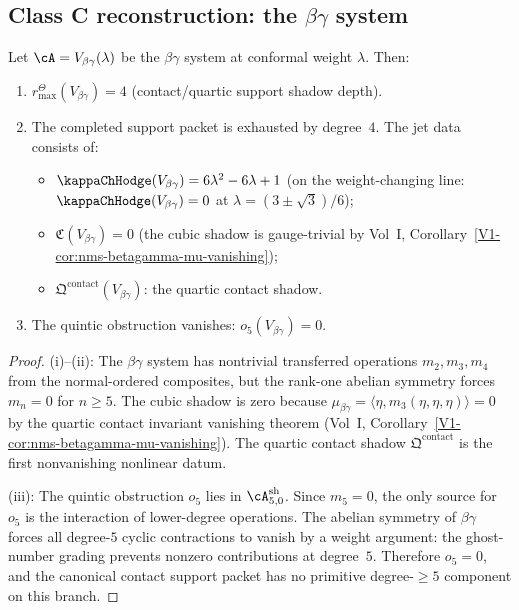 \subsection{Class C reconstruction: the $\beta\gamma$ system}

\begin{theorem}
\label{thm:class-c-reconstruction}
Let $\cA = V_{\beta\gamma}(\lambda)$ be the $\beta\gamma$ system at conformal weight
$\lambda$. Then:
\begin{enumerate}[label=\textup{(\roman*)}]
\item \(r^\Theta_{\max}(V_{\beta\gamma}) = 4\) (contact/quartic support shadow depth).
\item The completed support packet is exhausted by degree~$4$. The jet data consists of:
 \begin{itemize}
 \item $\kappaChHodge(V_{\beta\gamma}) = 6\lambda^2 - 6\lambda + 1$ (on the weight-changing
 line: \(\kappaChHodge(V_{\beta\gamma}) = 0\) at
 \(\lambda = (3 \pm \sqrt{3})/6\));
 \item $\mathfrak{C}(V_{\beta\gamma}) = 0$ (the cubic shadow is gauge-trivial by
 Vol~I, Corollary~\ref*{V1-cor:nms-betagamma-mu-vanishing});
 \item $\mathfrak{Q}^{\mathrm{contact}}(V_{\beta\gamma})$: the quartic contact shadow.
 \end{itemize}
\item The quintic obstruction vanishes: $o_5(V_{\beta\gamma}) = 0$.
\end{enumerate}
\end{theorem}

\begin{proof}
(i)--(ii): The $\beta\gamma$ system has nontrivial transferred operations
$m_2, m_3, m_4$ from the normal-ordered composites, but the rank-one abelian symmetry
forces $m_n = 0$ for $n \geq 5$. The cubic shadow is zero because
$\mu_{\beta\gamma} = \langle \eta, m_3(\eta, \eta, \eta) \rangle = 0$ by the quartic
contact invariant vanishing theorem (Vol~I, Corollary~\ref*{V1-cor:nms-betagamma-mu-vanishing}).
The quartic contact shadow $\mathfrak{Q}^{\mathrm{contact}}$ is the first nonvanishing
nonlinear datum.

(iii): The quintic obstruction $o_5$ lies in $\cA^{\mathrm{sh}}_{5,0}$. Since
$m_5 = 0$, the only source for $o_5$ is the interaction of lower-degree operations.
The abelian symmetry of $\beta\gamma$ forces all degree-$5$ cyclic contractions to
vanish by a weight argument: the ghost-number grading prevents nonzero contributions
at degree~$5$. Therefore \(o_5=0\), and the canonical contact support
packet has no primitive degree-\(\ge5\) component on this branch.
\end{proof}

